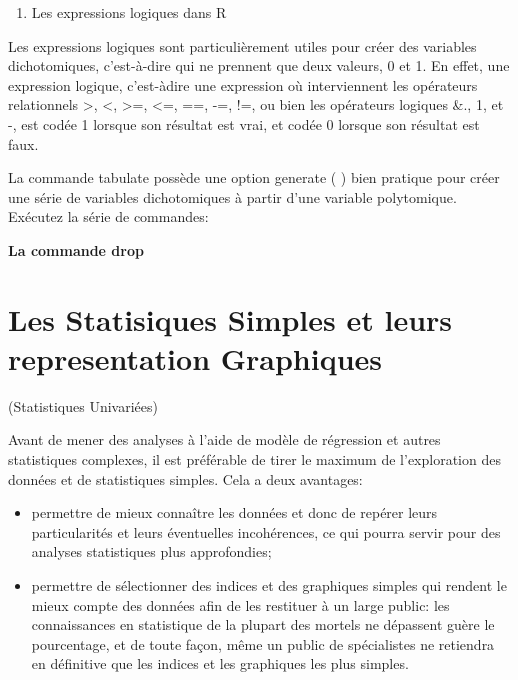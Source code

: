\documentclass[
]{book}
\providecommand{\tightlist}{%
  \setlength{\itemsep}{0pt}\setlength{\parskip}{0pt}}
\theoremstyle{definition}
\theoremstyle{definition}
\theoremstyle{definition}
\theoremstyle{definition}
\theoremstyle{remark}
\begin{document}
\begin{enumerate}
\def\labelenumi{(\arabic{enumi})}
\setcounter{enumi}{2}
\tightlist
\item
  Les expressions logiques dans R
\end{enumerate}

Les expressions logiques sont particulièrement utiles pour créer
des variables dichotomiques, c'est-à-dire qui ne prennent que
deux valeurs, 0 et 1. En effet, une expression logique, c'est-àdire
une expression où interviennent les opérateurs relationnels
\textgreater, \textless, \textgreater=, \textless=, ==, -=, !=, ou bien les opérateurs logiques \&., 1, et
-, est codée 1 lorsque son résultat est vrai, et codée 0 lorsque
son résultat est faux.

La commande tabulate possède une option generate ( ) bien
pratique pour créer une série de variables dichotomiques à partir
d'une variable polytomique. Exécutez la série de commandes:

\textbf{La commande drop}

\hypertarget{les-statisiques-simples-et-leurs-representation-graphiques}{%
\chapter{Les Statisiques Simples et leurs representation Graphiques}\label{les-statisiques-simples-et-leurs-representation-graphiques}}

(Statistiques Univariées)

Avant de mener des analyses à l'aide de modèle de régression et
autres statistiques complexes, il est préférable de tirer le
maximum de l'exploration des données et de statistiques
simples. Cela a deux avantages:

\begin{itemize}
\tightlist
\item
  permettre de mieux connaître les données et donc de repérer
  leurs particularités et leurs éventuelles incohérences, ce qui
  pourra servir pour des analyses statistiques plus
  approfondies;
\item
  permettre de sélectionner des indices et des graphiques
  simples qui rendent le mieux compte des données afin de les
  restituer à un large public: les connaissances en statistique de
  la plupart des mortels ne dépassent guère le pourcentage, et
  de toute façon, même un public de spécialistes ne retiendra en
  définitive que les indices et les graphiques les plus simples.
\end{itemize}
\end{document}
